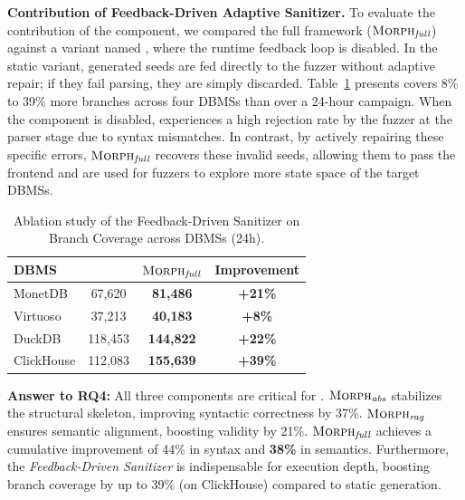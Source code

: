 \documentclass[sigconf,review,anonymous]{acmart}
\begin{document}
\textbf{Contribution of Feedback-Driven Adaptive Sanitizer.}
To evaluate the contribution of the component, we compared the full framework ($\textsc{Morph}{}_{\textit{full}}$) against a variant named \tooldisfuzzer{}, where the runtime feedback loop is disabled. In the static variant, generated seeds are fed directly to the fuzzer without adaptive repair; if they fail parsing, they are simply discarded.
Table~\ref{tab:ablation_sanitizer} presents \tool{} covers 8\% to 39\% more branches across four DBMSs than \tooldisfuzzer{} over a 24-hour campaign. 
When the component is disabled, \tooldisfuzzer{} experiences a high rejection rate by the fuzzer at the parser stage due to syntax mismatches.
In contrast, by actively repairing these specific errors, $\textsc{Morph}{}_{\textit{full}}$ recovers these invalid seeds, allowing them to pass the frontend and are used for fuzzers to explore more state space of the target DBMSs. 

\begin{table}[t]
\centering
\small
\caption{Ablation study of the Feedback-Driven Sanitizer on Branch Coverage across DBMSs (24h).}
\label{tab:ablation_sanitizer}
\begin{tabular}{lccc}
\toprule
\textbf{DBMS} & \tooldisfuzzer{} & $\textsc{Morph}{}_{\textit{full}}$ & \textbf{Improvement} \\
\midrule
MonetDB    & 67,620 & \textbf{81,486}  & \textbf{+21\%} \\
Virtuoso   & 37,213 & \textbf{40,183}  & \textbf{+8\%} \\
DuckDB     & 118,453 & \textbf{144,822} & \textbf{+22\%} \\
ClickHouse & 112,083 & \textbf{155,639} & \textbf{+39\%} \\
\bottomrule
\end{tabular}
\end{table}

\begin{answerbox}
\textbf{Answer to RQ4:} All three components are critical for \tool{}. $\textsc{Morph}{}_{\textit{abs}}$ stabilizes the structural skeleton, improving syntactic correctness by 37\%. $\textsc{Morph}{}_{\textit{rag}}$ ensures semantic alignment, boosting validity by 21\%. $\textsc{Morph}{}_{\textit{full}}$ achieves a cumulative improvement of 44\% in syntax and \textbf{38\%} in semantics. 
Furthermore, the \textit{Feedback-Driven Sanitizer} is indispensable for execution depth, boosting branch coverage by up to 39\% (on ClickHouse) compared to static generation.
\end{answerbox}
\end{document}
